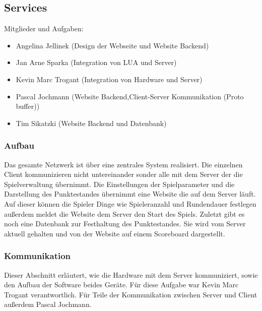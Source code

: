 \subsection{Services}
\label{services}

Mitglieder und Aufgaben:
\begin{itemize}
  \item
    Angelina Jellinek (Design der Webseite und Website Backend)
  \item
    Jan Arne Sparka (Integration von LUA und Server)
  \item
    Kevin Marc Trogant (Integration von Hardware und Server)
  \item
    Pascal Jochmann (Website Backend,Client-Server Kommunikation (Proto buffer))
  \item
    Tim Sikatzki (Website Backend und Datenbank)
\end{itemize}

\subsubsection{Aufbau}
Das gesamte Netzwerk ist über eine zentrales System realisiert. Die einzelnen 
Client kommunizieren nicht untereinander sonder alle mit dem Server der die Spielverwaltung übernimmt. 
Die Einstellungen der Spielparameter und die Darstellung des Punktestandes übernimmt eine Website die auf dem Server läuft. 
Auf dieser können die Spieler Dinge wie Spieleranzahl und Rundendauer festlegen außerdem meldet 
die Website dem Server den Start des Spiels. Zuletzt gibt es noch eine Datenbank zur Festhaltung des Punktestandes. 
Sie wird vom Server aktuell gehalten und von der Website auf einem Scoreboard dargestellt.

\subsubsection{Kommunikation}
Dieser Abschnitt erläutert, wie die Hardware mit dem Server kommuniziert, sowie den Aufbau der Software beides Geräte.
Für diese Aufgabe war Kevin Marc Trogant verantwortlich. Für Teile der Kommunikation zwischen Server und Client außerdem Pascal Jochmann.

